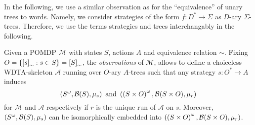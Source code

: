 In the following, we use a similar observation as for the \enquote{equivalence}
of unary trees to words. Namely, we consider strategies of the form
$f:D^{*}\rightarrow\Sigma$ as $D$-ary $\Sigma$-trees. Therefore, we use the
terms strategies and trees interchangably in the following.
\begin{lemma}
  Given a \ac{POMDP} $\mathcal{M}$ with states $S$, actions $A$ and equivalence
  relation $\sim$. Fixing $O = \left\{\left[s\right]_{\sim}:s\in S\right\}
  = \left[S\right]_{\sim}$, the \emph{observations} of $\mathcal{M}$, allows to
  define a choiceless \ac{WDTA}-skeleton $\mathcal{A}$ running over $O$-ary
  $A$-trees such that any strategy $s:O^{*}\rightarrow A$ induces
  \begin{equation*}
    \left(S^{\omega}, \mathcal{B}(S), \mu_{s}\right)
    \text{ and }
    \left(\left(S\times O\right)^{\omega}, \mathcal{B}(S\times O), \mu_{r}\right)
  \end{equation*}
  for $\mathcal{M}$ and $\mathcal{A}$ respectively if $r$ is the unique run of
  $\mathcal{A}$ on $s$. Moreover, $\left(S^{\omega}, \mathcal{B}(S), \mu_{s}\right)$
  can be isomorphically embedded into $\left(\left(S\times O\right)^{\omega},
  \mathcal{B}(S\times O), \mu_{r}\right)$.
  \label{lem:POMDPequivWDTA}
\end{lemma}
